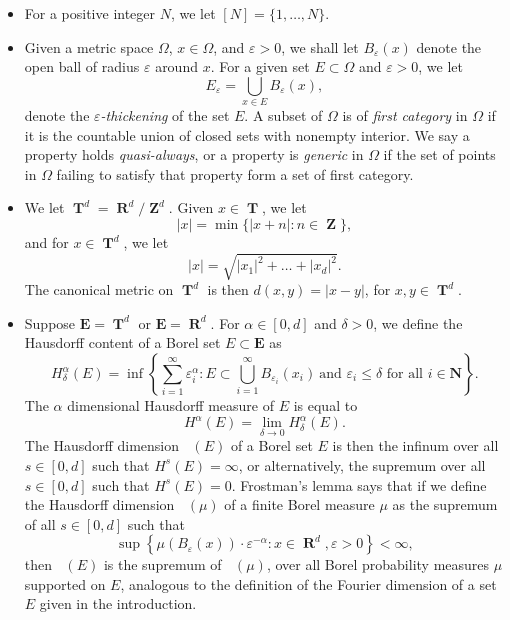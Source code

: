 \documentclass[12pt,reqno]{article}
\DeclareMathOperator{\hausdim}{\dim_{\mathbf{H}}}
\DeclareMathOperator{\RR}{\mathbf{R}}
\DeclareMathOperator{\ZZ}{\mathbf{Z}}
\DeclareMathOperator{\TT}{\mathbf{T}}
\begin{document}
\begin{itemize}
    \item For a positive integer $N$, we let $[N] = \{ 1, \dots, N \}$.

    \item Given a metric space $\Omega$, $x \in \Omega$, and $\varepsilon > 0$, we shall let $B_\varepsilon(x)$ denote the open ball of radius $\varepsilon$ around $x$. For a given set $E \subset \Omega$ and $\varepsilon > 0$, we let
    \[ E_\varepsilon = \bigcup_{x \in E} B_\varepsilon(x), \]
    denote the \emph{$\varepsilon$-thickening} of the set $E$. A subset of $\Omega$ is of \emph{first category} in $\Omega$ if it is the countable union of closed sets with nonempty interior. We say a property holds \emph{quasi-always}, or a property is \emph{generic} in $\Omega$ if the set of points in $\Omega$ failing to satisfy that property form a set of first category.

    \item We let $\TT^d = \RR^d/\ZZ^d$. Given $x \in \TT$, we let
    \[ |x| = \min \{ |x + n| : n \in \ZZ \}, \]
    and for $x \in \TT^d$, we let
    \[ |x| = \sqrt{|x_1|^2 + \dots + |x_d|^2}. \]
    The canonical metric on $\TT^d$ is then $d(x,y) = |x - y|$, for $x,y \in \TT^d$.

    \item Suppose $\mathbf{E} = \TT^d$ or $\mathbf{E} = \RR^d$. For $\alpha \in [0,d]$ and $\delta > 0$, we define the Hausdorff content of a Borel set $E \subset \mathbf{E}$ as
    \[ H^\alpha_\delta(E) = \inf \left\{ \sum_{i = 1}^\infty \varepsilon_i^\alpha : E \subset \bigcup_{i = 1}^\infty B_{\varepsilon_i}(x_i)\ \text{and $\varepsilon_i \leq \delta$ for all $i \in \mathbf{N}$} \right\}. \]
    The $\alpha$ dimensional Hausdorff measure of $E$ is equal to
    \[ H^\alpha(E) = \lim_{\delta \to 0} H^\alpha_\delta(E). \]
    The Hausdorff dimension $\hausdim(E)$ of a Borel set $E$ is then the infinum over all $s \in [0,d]$ such that $H^s(E) = \infty$, or alternatively, the supremum over all $s \in [0,d]$ such that $H^s(E) = 0$. Frostman's lemma says that if we define the Hausdorff dimension $\hausdim(\mu)$ of a finite Borel measure $\mu$ as the supremum of all $s \in [0,d]$ such that
    \begin{equation} \label{hausdim}
        \sup \left\{ \mu(B_\varepsilon(x)) \cdot \varepsilon^{-\alpha} : x \in \RR^d, \varepsilon > 0 \right\} < \infty,
    \end{equation}
    then $\hausdim(E)$ is the supremum of $\hausdim(\mu)$, over all Borel probability measures $\mu$ supported on $E$, analogous to the definition of the Fourier dimension of a set $E$ given in the introduction.


\end{itemize}
\end{document}
